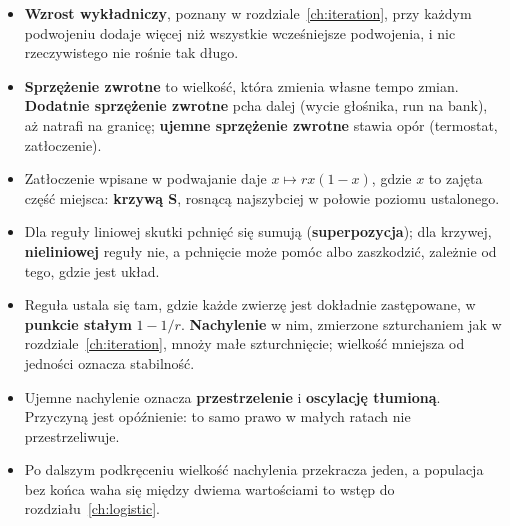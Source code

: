 \begin{summarybox}
\begin{itemize}
\item \textbf{Wzrost wykładniczy}, poznany w rozdziale~\ref{ch:iteration},
  przy każdym podwojeniu dodaje więcej niż wszystkie wcześniejsze podwojenia,
  i nic rzeczywistego nie rośnie tak długo.
\item \textbf{Sprzężenie zwrotne} to wielkość, która zmienia własne tempo
  zmian. \textbf{Dodatnie sprzężenie zwrotne} pcha dalej (wycie głośnika, run
  na bank), aż natrafi na granicę; \textbf{ujemne sprzężenie zwrotne} stawia
  opór (termostat, zatłoczenie).
\item Zatłoczenie wpisane w podwajanie daje $x \mapsto r x (1 - x)$, gdzie $x$ to
  zajęta część miejsca: \textbf{krzywą S}, rosnącą najszybciej w połowie
  poziomu ustalonego.
\item Dla reguły liniowej skutki pchnięć się sumują
  (\textbf{superpozycja}); dla krzywej, \textbf{nieliniowej} reguły nie, a
  pchnięcie może pomóc albo zaszkodzić, zależnie od tego, gdzie jest układ.
\item Reguła ustala się tam, gdzie każde zwierzę jest dokładnie zastępowane,
  w \textbf{punkcie stałym} $1 - 1/r$. \textbf{Nachylenie} w nim, zmierzone
  szturchaniem jak w rozdziale~\ref{ch:iteration}, mnoży małe szturchnięcie;
  wielkość mniejsza od jedności oznacza stabilność.
\item Ujemne nachylenie oznacza \textbf{przestrzelenie} i \textbf{oscylację
  tłumioną}. Przyczyną jest opóźnienie: to samo prawo w małych ratach nie
  przestrzeliwuje.
\item Po dalszym podkręceniu wielkość nachylenia przekracza jeden, a
  populacja bez końca waha się między dwiema wartościami \dash{} to wstęp do
  rozdziału~\ref{ch:logistic}.
\end{itemize}
\end{summarybox}

\canyou

